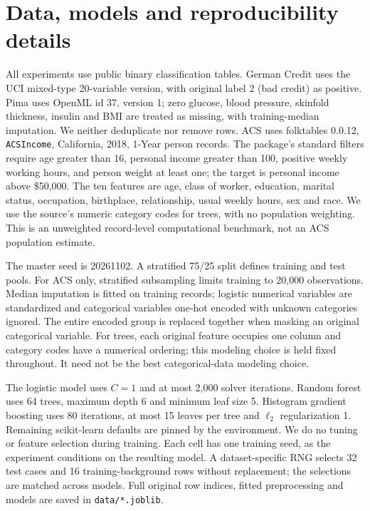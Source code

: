 \section{Data, models and reproducibility details}
\label{app:setup}
All experiments use public binary classification tables. German Credit uses the UCI mixed-type 20-variable version, with original label 2 (bad credit) as positive. Pima uses OpenML id 37, version 1; zero glucose, blood pressure, skinfold thickness, insulin and BMI are treated as missing, with training-median imputation. We neither deduplicate nor remove rows. ACS uses folktables 0.0.12, \texttt{ACSIncome}, California, 2018, 1-Year person records. The package's standard filters require age greater than 16, personal income greater than 100, positive weekly working hours, and person weight at least one; the target is personal income above \$50,000. The ten features are age, class of worker, education, marital status, occupation, birthplace, relationship, usual weekly hours, sex and race. We use the source's numeric category codes for trees, with no population weighting. This is an unweighted record-level computational benchmark, not an ACS population estimate.

The master seed is 20261102. A stratified 75/25 split defines training and test pools. For ACS only, stratified subsampling limits training to 20,000 observations. Median imputation is fitted on training records; logistic numerical variables are standardized and categorical variables one-hot encoded with unknown categories ignored. The entire encoded group is replaced together when masking an original categorical variable. For trees, each original feature occupies one column and category codes have a numerical ordering; this modeling choice is held fixed throughout. It need not be the best categorical-data modeling choice.

The logistic model uses $C=1$ and at most 2,000 solver iterations. Random forest uses 64 trees, maximum depth 6 and minimum leaf size 5. Histogram gradient boosting uses 80 iterations, at most 15 leaves per tree and $\ell_2$ regularization 1. Remaining scikit-learn defaults are pinned by the environment. We do no tuning or feature selection during training. Each cell has one training seed, as the experiment conditions on the resulting model. A dataset-specific RNG selects 32 test cases and 16 training-background rows without replacement; the selections are matched across models. Full original row indices, fitted preprocessing and models are saved in \texttt{data/*.joblib}.

